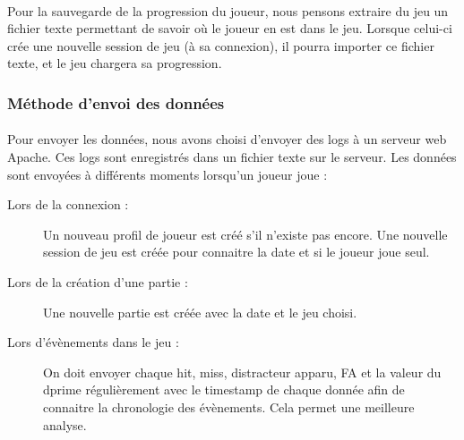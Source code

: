 \paragraph{}Pour la sauvegarde de la progression du joueur, nous pensons extraire du jeu un fichier texte permettant de savoir où le joueur en est dans le jeu. Lorsque celui-ci crée
une nouvelle session de jeu (à sa connexion), il pourra importer ce fichier texte, et le jeu chargera sa progression.

\subsubsection{Méthode d'envoi des données}

\paragraph{}Pour envoyer les données, nous avons choisi d'envoyer des logs à un serveur web Apache. Ces logs sont enregistrés dans un fichier texte sur le serveur. Les données sont
envoyées à différents moments lorsqu'un joueur joue :
\begin{description}
\item[Lors de la connexion :] Un nouveau profil de joueur est créé s'il n'existe pas encore. Une nouvelle session de jeu est créée pour connaitre la date et si le joueur joue seul.
\item[Lors de la création d'une partie :] Une nouvelle partie est créée avec la date et le jeu choisi.
\item[Lors d'évènements dans le jeu :] On doit envoyer chaque hit, miss, distracteur apparu, FA et la valeur du dprime régulièrement avec le timestamp de chaque donnée afin de
connaitre la chronologie des évènements. Cela permet une meilleure analyse.
\end{description}

